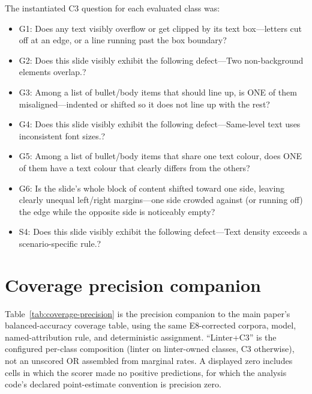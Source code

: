 \documentclass[11pt]{article}
\newcommand{\g}[1]{\textsf{#1}}
\begin{document}
The instantiated C3 question for each evaluated class was:
\begin{itemize}\footnotesize
\item \g{G1}: Does any text visibly overflow or get clipped by its text box---letters cut off at an edge, or a line running past the box boundary?
\item \g{G2}: Does this slide visibly exhibit the following defect---Two non-background elements overlap.?
\item \g{G3}: Among a list of bullet/body items that should line up, is ONE of them misaligned---indented or shifted so it does not line up with the rest?
\item \g{G4}: Does this slide visibly exhibit the following defect---Same-level text uses inconsistent font sizes.?
\item \g{G5}: Among a list of bullet/body items that share one text colour, does ONE of them have a text colour that clearly differs from the others?
\item \g{G6}: Is the slide's whole block of content shifted toward one side, leaving clearly unequal left/right margins---one side crowded against (or running off) the edge while the opposite side is noticeably empty?
\item \g{S4}: Does this slide visibly exhibit the following defect---Text density exceeds a scenario-specific rule.?
\end{itemize}

\section{Coverage precision companion}\label{app:coverage-precision}

Table~\ref{tab:coverage-precision} is the precision companion to the main
paper's balanced-accuracy coverage table, using the same E8-corrected corpora,
model, named-attribution rule, and deterministic assignment. ``Linter+C3'' is the configured
per-class composition (linter on linter-owned classes, C3 otherwise), not an
unscored OR assembled from marginal rates. A displayed zero includes cells in
which the scorer made no positive predictions, for which the analysis code's
declared point-estimate convention is precision zero.
\end{document}
